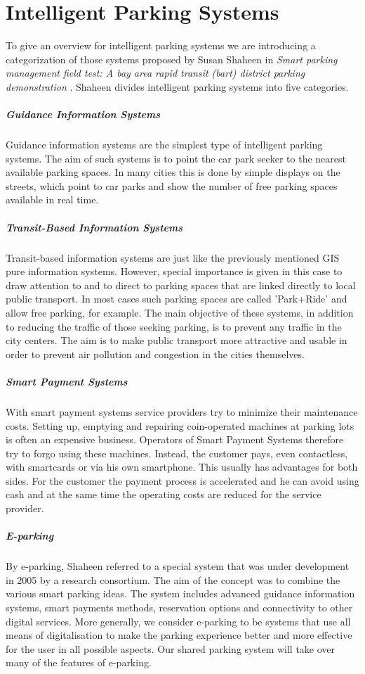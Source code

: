 \section{Intelligent Parking Systems}
To give an overview for intelligent parking systems we are introducing a categorization of those systems proposed by Susan Shaheen in \textit{Smart parking management field test: A bay area rapid transit (bart) district parking demonstration} \cite{shaheen2005smart}. Shaheen divides intelligent parking systems into five categories.
\subparagraph{Guidance Information Systems}
Guidance information systems are the simplest type of intelligent parking systems. The aim of such systems is to point the car park seeker to the nearest available parking spaces. In many cities this is done by simple displays on the streets, which point to car parks and show the number of free parking spaces available in real time.

\subparagraph{Transit-Based Information Systems}
Transit-based information systems are just like the previously mentioned GIS pure information systems. However, special importance is given in this case to draw attention to and to direct to parking spaces that are linked directly to local public transport. In most cases such parking spaces are called 'Park+Ride' and allow free parking, for example. The main objective of these systems, in addition to reducing the traffic of those seeking parking, is to prevent any traffic in the city centers. The aim is to make public transport more attractive and usable in order to prevent air pollution and congestion in the cities themselves. 

\subparagraph{Smart Payment Systems}
With smart payment systems service providers try to minimize their maintenance costs. Setting up, emptying and repairing coin-operated machines at parking lots is often an expensive business. Operators of Smart Payment Systems therefore try to forgo using these machines. Instead, the customer pays, even contactless, with smartcards or via his own smartphone. This usually has advantages for both sides. For the customer the payment process is accelerated and he can avoid using cash and at the same time the operating costs are reduced for the service provider.

\subparagraph{E-parking}
By e-parking, Shaheen referred to a special system that was under development in 2005 by a research consortium. The aim of the concept was to combine the various smart parking ideas. The system includes advanced guidance information systems, smart payments methods, reservation options and connectivity to other digital services. More generally, we consider e-parking to be systems that use all means of digitalisation to make the parking experience better and more effective for the user in all possible aspects. Our shared parking system will take over many of the features of e-parking.

